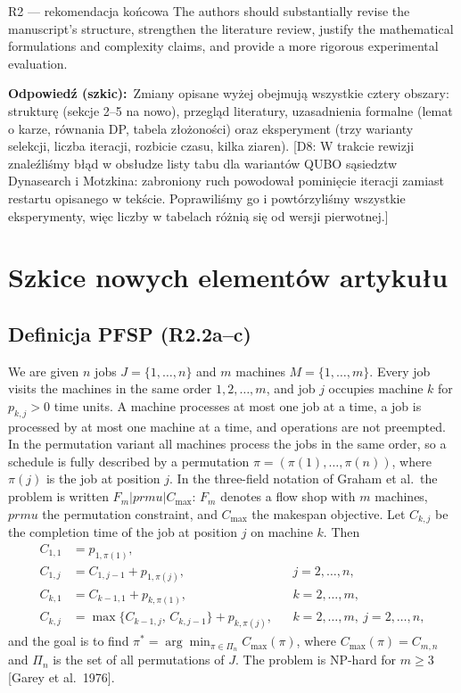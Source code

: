 \documentclass[11pt,a4paper]{article}
\newcommand{\odp}{\par\textbf{\sffamily Odpowiedź (szkic):}\ }
\newcommand{\Cmax}{C_{\max}}
\begin{document}
\begin{rev}{R2 — rekomendacja końcowa}
The authors should substantially revise the manuscript's structure, strengthen the literature review, justify the mathematical formulations and complexity claims, and provide a more rigorous experimental evaluation.
\end{rev}
\odp Zmiany opisane wyżej obejmują wszystkie cztery obszary: strukturę (sekcje 2--5 na nowo), przegląd literatury, uzasadnienia formalne (lemat o karze, równania DP, tabela złożoności) oraz eksperyment (trzy warianty selekcji, liczba iteracji, rozbicie czasu, kilka ziaren). [D8: W trakcie rewizji znaleźliśmy błąd w obsłudze listy tabu dla wariantów QUBO sąsiedztw Dynasearch i Motzkina: zabroniony ruch powodował pominięcie iteracji zamiast restartu opisanego w tekście. Poprawiliśmy go i powtórzyliśmy wszystkie eksperymenty, więc liczby w tabelach różnią się od wersji pierwotnej.]

\section{Szkice nowych elementów artykułu}\label{sec:szkice}

\subsection{Definicja PFSP (R2.2a--c)}\label{sec:def}

\begin{pozmianie}
We are given $n$ jobs $J=\{1,\dots,n\}$ and $m$ machines $M=\{1,\dots,m\}$. Every job visits the machines in the same order $1,2,\dots,m$, and job $j$ occupies machine $k$ for $p_{k,j}>0$ time units. A machine processes at most one job at a time, a job is processed by at most one machine at a time, and operations are not preempted. In the permutation variant all machines process the jobs in the same order, so a schedule is fully described by a permutation $\pi=(\pi(1),\dots,\pi(n))$, where $\pi(j)$ is the job at position $j$. In the three-field notation of Graham et al.\ the problem is written $F_m|prmu|\Cmax$: $F_m$ denotes a flow shop with $m$ machines, $prmu$ the permutation constraint, and $\Cmax$ the makespan objective. Let $C_{k,j}$ be the completion time of the job at position $j$ on machine $k$. Then
\begin{align*}
C_{1,1} &= p_{1,\pi(1)},\\
C_{1,j} &= C_{1,j-1}+p_{1,\pi(j)}, && j=2,\dots,n,\\
C_{k,1} &= C_{k-1,1}+p_{k,\pi(1)}, && k=2,\dots,m,\\
C_{k,j} &= \max\{C_{k-1,j},\,C_{k,j-1}\}+p_{k,\pi(j)}, && k=2,\dots,m,\ j=2,\dots,n,
\end{align*}
and the goal is to find $\pi^*=\arg\min_{\pi\in\Pi_n}\Cmax(\pi)$, where $\Cmax(\pi)=C_{m,n}$ and $\Pi_n$ is the set of all permutations of $J$. The problem is NP-hard for $m\ge 3$ [Garey et al.\ 1976].
\end{pozmianie}
\end{document}
